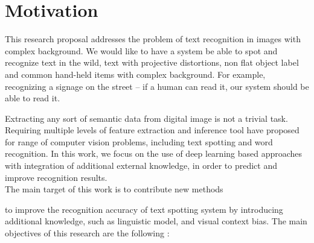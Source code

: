 \documentclass[phd,tocprelim]{cornell}
\begin{document}
\section{Motivation}




This research proposal addresses the problem of text recognition in images with complex background. We would like to have a system be able to spot and recognize text in the wild, text with projective distortions, non flat object label and common hand-held items with complex background. For example, recognizing a signage on the street -- if a human can read it, our system should be able to read it. 
\smallskip

Extracting any sort of semantic data from digital image is not a trivial task. Requiring multiple levels of feature extraction and inference tool have proposed for range of computer vision problems, including text spotting and word recognition. In this work, we focus on the use of deep learning based approaches with integration of additional external knowledge, in order to predict and improve recognition results. 
\\ 
The main target of this work is to contribute new methods %





to improve the recognition accuracy of text spotting system by introducing additional knowledge, such as linguistic model, and visual context bias. The main objectives of this research are the following :                            

\end{document}
